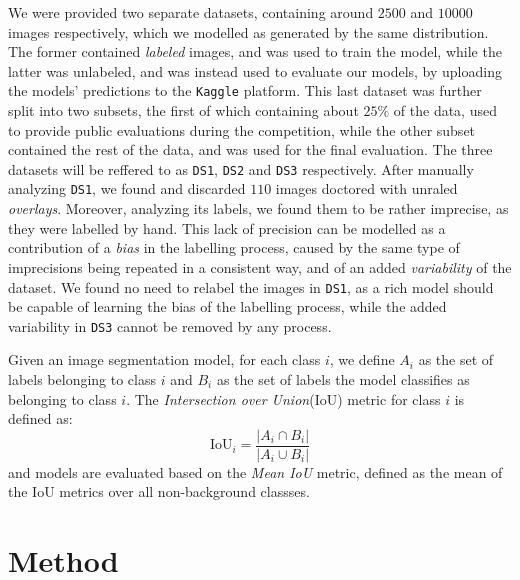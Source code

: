 \documentclass[11pt]{article}
\begin{document}
\begin{multicols}{2}

      We were provided two separate datasets, containing around $2500$ and $10000$ images respectively, which we modelled as generated by the same distribution. The former contained \textit{labeled} images, and was used to train the model, while the latter was unlabeled, and was instead used to evaluate our models, by uploading the models' predictions to the \texttt{Kaggle}\cite{kaggle} platform. This last dataset was further split into two subsets, the first of which containing about $25\%$ of the data, used to provide public evaluations during the competition, while the other subset contained the rest of the data, and was used for the final evaluation. The three datasets will be reffered to as \texttt{DS1}, \texttt{DS2} and \texttt{DS3} respectively. After manually analyzing \texttt{DS1}, we found and discarded $110$ images doctored with unraled \textit{overlays}. Moreover, analyzing its labels, we found them to be rather imprecise, as they were labelled by hand. This lack of precision can be modelled as a contribution of a \textit{bias} in the labelling process, caused by the same type of imprecisions being repeated in a consistent way, and of an added \textit{variability} of the dataset. We found no need to relabel the images in \texttt{DS1}, as a rich model should be capable of learning the bias of the labelling process, while the added variability in \texttt{DS3} cannot be removed by any process.

      Given an image segmentation model, for each class $i$, we define $A_i$ as the set of labels belonging to class $i$ and $B_i$ as the set of labels the model classifies as belonging to class $i$. The \textit{Intersection over Union}(IoU) metric for class $i$ is defined as: $$\text{IoU}_i = \dfrac{|A_i \cap B_i|}{|A_i \cup B_i|}$$ and models are evaluated based on the \textit{Mean IoU} metric, defined as the mean of the IoU metrics over all non-background classses.

      \section{Method}


\end{multicols}
\end{document}
